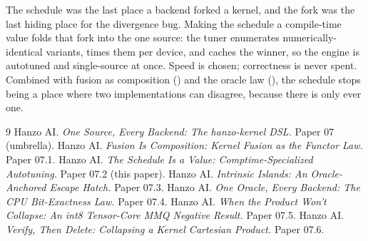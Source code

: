 \documentclass[11pt]{article}
\begin{document}
The schedule was the last place a backend forked a kernel, and the fork was the last hiding place for the
divergence bug. Making the schedule a compile-time value folds that fork into the one source: the tuner
enumerates numerically-identical variants, times them per device, and caches the winner, so the engine is
autotuned and single-source at once. Speed is chosen; correctness is never spent. Combined with fusion as
composition (\cite{fuse}) and the oracle law (\cite{oracle}), the schedule stops being a place where two
implementations can disagree, because there is only ever one.

\begin{thebibliography}{9}
\small
{} Hanzo AI. \emph{One Source, Every Backend: The hanzo-kernel DSL.} Paper 07 (umbrella).
 Hanzo AI. \emph{Fusion Is Composition: Kernel Fusion as the Functor Law.} Paper 07.1.
 Hanzo AI. \emph{The Schedule Is a Value: Comptime-Specialized Autotuning.} Paper 07.2 (this paper).
 Hanzo AI. \emph{Intrinsic Islands: An Oracle-Anchored Escape Hatch.} Paper 07.3.
 Hanzo AI. \emph{One Oracle, Every Backend: The CPU Bit-Exactness Law.} Paper 07.4.
 Hanzo AI. \emph{When the Product Won't Collapse: An int8 Tensor-Core MMQ Negative Result.} Paper 07.5.
 Hanzo AI. \emph{Verify, Then Delete: Collapsing a Kernel Cartesian Product.} Paper 07.6.
\end{thebibliography}
\end{document}
